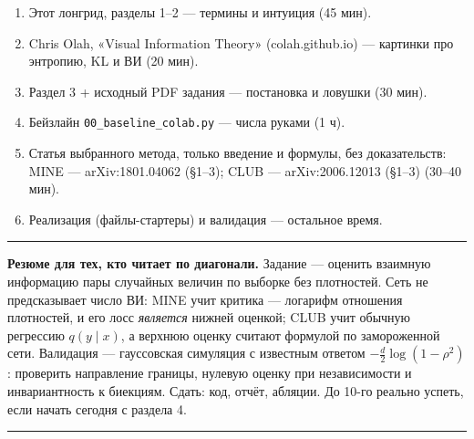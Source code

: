 \documentclass[11pt]{article}
\newenvironment{exbox}{%
  \par\medskip\noindent
  \begin{minipage}[t]{\linewidth}
  \color{accent}\rule[2pt]{\linewidth}{0.6pt}\color{black}
  \vspace{0.4em}\noindent\small
}{%
  \vspace{0.4em}
  \color{accent}\rule[2pt]{\linewidth}{0.6pt}\color{black}
  \end{minipage}\par\medskip
}
\begin{document}
\begin{enumerate}[label=\arabic*.]
\item Этот лонгрид, разделы 1--2 — термины и интуиция (45 мин).
\item Chris Olah, «Visual Information Theory» (colah.github.io) — картинки про энтропию, KL и ВИ (20 мин).
\item Раздел 3 + исходный PDF задания — постановка и ловушки (30 мин).
\item Бейзлайн \texttt{00\_baseline\_colab.py} — числа руками (1 ч).
\item Статья выбранного метода, только введение и формулы, без доказательств: MINE — arXiv:1801.04062 (§1--3); CLUB — arXiv:2006.12013 (§1--3) (30--40 мин).
\item Реализация (файлы-стартеры) и валидация — остальное время.
\end{enumerate}

\begin{exbox}
\textbf{Резюме для тех, кто читает по диагонали.} Задание — оценить взаимную информацию пары случайных величин по выборке без плотностей. Сеть не предсказывает число ВИ: MINE учит критика — логарифм отношения плотностей, и его лосс \emph{является} нижней оценкой; CLUB учит обычную регрессию $q(y\mid x)$, а верхнюю оценку считают формулой по замороженной сети. Валидация — гауссовская симуляция с известным ответом $-\frac d2\log(1-\rho^2)$: проверить направление границы, нулевую оценку при независимости и инвариантность к биекциям. Сдать: код, отчёт, абляции. До 10-го реально успеть, если начать сегодня с раздела 4.
\end{exbox}
\end{document}
